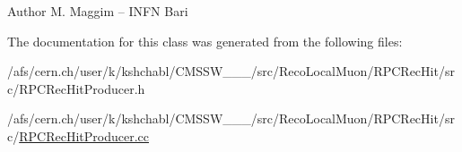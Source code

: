 \begin{DoxyAuthor}{Author}
M. Maggim -- I\-N\-F\-N Bari 
\end{DoxyAuthor}


The documentation for this class was generated from the following files\-:\begin{DoxyCompactItemize}
\item 
/afs/cern.\-ch/user/k/kshchabl/\-C\-M\-S\-S\-W\-\_\-\_\-\_/src/\-Reco\-Local\-Muon/\-R\-P\-C\-Rec\-Hit/src/R\-P\-C\-Rec\-Hit\-Producer.\-h\item 
/afs/cern.\-ch/user/k/kshchabl/\-C\-M\-S\-S\-W\-\_\-\_\-\_/src/\-Reco\-Local\-Muon/\-R\-P\-C\-Rec\-Hit/src/\hyperlink{RPCRecHitProducer_8cc}{R\-P\-C\-Rec\-Hit\-Producer.\-cc}\end{DoxyCompactItemize}
